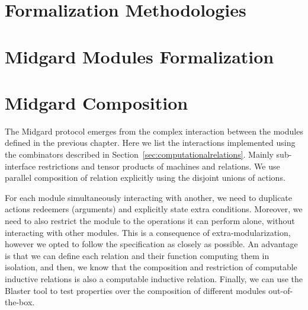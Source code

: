 
%
%

\chapter{Formalization Methodologies}


\chapter{Midgard Modules Formalization}










\chapter{Midgard Composition}

The Midgard protocol emerges from the complex interaction between the modules
defined in the previous chapter.
%
Here we list the interactions implemented using the combinators described in
Section~\ref{sec:computationalrelations}.
%
Mainly sub-interface restrictions and tensor products of machines and relations.
%
We use parallel composition of relation explicitly using the disjoint unions of
actions.

For each module simultaneously interacting with another, we need to duplicate actions redeemers
(arguments) and explicitly state extra conditions.
%
Moreover, we need to also restrict the module to the operations it can perform
alone, without interacting with other modules.
%
This is a consequence of extra-modularization, however we opted to follow the
specification as closely as possible.
%
An advantage is that we can define each relation and their function computing them in isolation,
and then, we know that the composition and restriction of computable inductive
relations is also a computable inductive relation.
%
Finally, we can use the Blaster tool to test properties over the composition of
different modules out-of-the-box.


